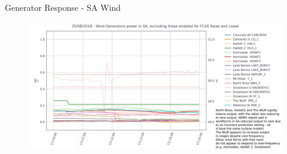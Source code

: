 \begin{frame}{Generator Response - SA Wind}

\begin{figure}
    \centering
    \includegraphics[width=\linewidth]{figures/SA_Wind_PU_annotated.png}
    \label{fig:sa_wind}
\end{figure}


\end{frame}
